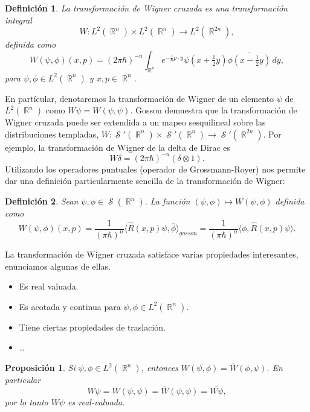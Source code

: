 \documentclass[a4paper]{report}
\DeclareMathOperator{\R}{\mathbb{R}}
\DeclareMathOperator{\Sz}{\mathcal S}
\newtheorem{definition}{Definición}
\newtheorem{proposition}{Proposición}
\begin{document}
  \begin{definition}
    La transformación de Wigner cruzada es una
    transformación integral
    \[
      W : L^2(\R^{n}) \times L^2(\R^{n}) \to L^2(\R^{2n}),
    \]
    definida como
    \begin{equation}
      \label{eqn:cross_wigner_transform}
      W(\psi,\phi)(x,p)
      = (2\pi\hbar)^{-n} \int_{\R^{n}} e^{-\frac{i}{\hbar} p
      \cdot y} \psi(x + \tfrac{1}{2}y) \overline{\phi(x -
      \tfrac{1}{2}y)} \, dy,
    \end{equation}
    para $\psi, \phi \in L^2(\R^{n})$ y $x,p \in \R^{n}$.  
  \end{definition}
  En partícular, denotaremos la transformación de Wigner de
  un elemento $\psi$ de $L^2(\R^{n})$ como $W\psi =
  W(\psi,\psi)$. Gosson demuestra que la transformación de
  Wigner cruzada puede ser extendida a un mapeo sesquilineal
  sobre las distribuciones templadas, $W : \Sz'(\R^{n})
  \times \Sz'(\R^{n}) \to \Sz'(\R^{2n})$. Por ejemplo, la
  transformación de Wigner de la delta de Dirac es
  \[
    W\delta = (2\pi\hbar)^{-n} (\delta \otimes 1).
  \] 
  Utilizando los operadores puntuales (operador de
  Grossmann-Royer) nos permite dar una definición
  particularmente sencilla de la transformación de Wigner:
  \begin{definition}
    Sean $\psi,\phi \in \Sz(\R^{n})$. La función
    $(\psi,\phi) \mapsto W(\psi,\phi)$ definida como
    \begin{equation}
      W(\psi,\phi)(x,p)
      = \frac{1}{(\pi\hbar)^{n}} \langle \hat{R}(x,p)\psi,
      \overline{\phi} \rangle_{gosson}
      = \frac{1}{(\pi\hbar)^{n}} \langle \phi,
      \hat{R}(x,p)\psi \rangle.
    \end{equation}
  \end{definition}
  La transformación de Wigner cruzada satisface varias
  propiedades interesantes, enunciamos algunas de ellas.
  \begin{itemize}
    \item Es real valuada.
    \item Es acotada y continua para $\psi,\phi \in
      L^2(\R^{n})$.
    \item Tiene ciertas propiedades de traslación.
    \item \ldots
  \end{itemize}
  \begin{proposition}
    Si $\psi, \phi \in L^2(\R^{n})$, entonces $W(\psi,\phi)
    = \overline{W}(\phi,\psi)$. En particular
    \[
      W\psi
      = W(\psi,\psi)
      = \overline{W}(\psi,\psi)
      = \overline{W\psi},
    \] 
    por lo tanto $W\psi$ es real-valuada. 
  \end{proposition}
\end{document}
